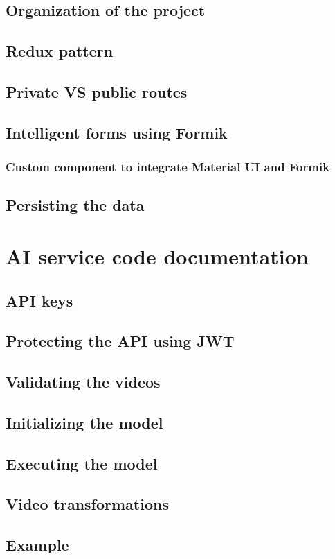    \subsection{Organization of the project}
    \subsection{Redux pattern}
    \subsection{Private VS public routes}
    \subsection{Intelligent forms using Formik}
        \subsubsection{Custom component to integrate Material UI and Formik}
    \subsection{Persisting the data}

\section{AI service code documentation}
    \subsection{API keys}
    \subsection{Protecting the API using JWT}
    \subsection{Validating the videos}
    \subsection{Initializing the model}
    \subsection{Executing the model}
        \subsection{Video transformations}
    \subsection{Example}
    
